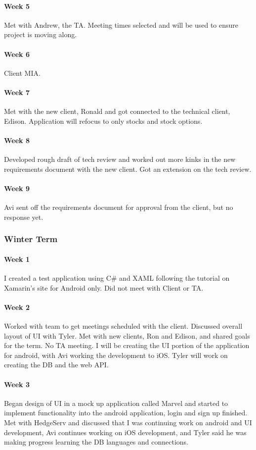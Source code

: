 \documentclass[onecolumn, draftclsnofoot,10pt, compsoc]{IEEEtran}
\begin{document}
\paragraph{Week 5}
Met with Andrew, the TA. Meeting times selected and will be used to ensure project is moving along.
\paragraph{Week 6}
Client MIA.
\paragraph{Week 7}
Met with the new client, Ronald and got connected to the technical client, Edison. Application will refocus to only  stocks and stock  options.
\paragraph{Week 8}
Developed rough draft of tech review and worked out more kinks in the new requirements document with the new client. Got an extension on the tech review.
\paragraph{Week 9}
Avi sent off the requirements document for approval from the client, but no response yet.


\subsubsection{Winter Term}
\paragraph{Week 1}
    I created a test application using C\# and XAML following the tutorial on Xamarin's site for Android only.
    Did not meet with Client or TA.
\paragraph{Week 2}
    Worked with team to get meetings scheduled with the client. Discussed overall layout of UI with Tyler.
    Met with new clients, Ron and Edison, and shared goals for the term. No TA meeting.
    I will be creating the UI portion of the application for android, with Avi working the development
    to iOS. Tyler will work on creating the DB and the web API.
\paragraph{Week 3}
Began design of UI in a mock up application called Marvel and started to implement functionality into the 
    android application, login and sign up finished.
    Met with HedgeServ and discussed that I was continuing work on android and UI development, Avi continues 
    working on iOS development, and Tyler said he was making progress learning the DB languages and connections.
\end{document}
